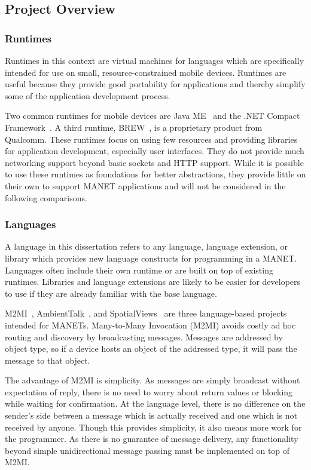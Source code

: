 \subsection{Project Overview}

\subsubsection{Runtimes}

Runtimes in this context are virtual machines for languages which are specifically intended for use on small, resource-constrained mobile devices. Runtimes are useful because they provide good portability for applications and thereby simplify some of the application development process.

Two common runtimes for mobile devices are Java ME~\cite{javame} and the .NET Compact Framework~\cite{dotnetcf}. A third runtime, BREW~\cite{brew}, is a proprietary product from Qualcomm. These runtimes focus on using few resources and providing libraries for application development, especially user interfaces. They do not provide much networking support beyond basic sockets and HTTP support. While it is possible to use these runtimes as foundations for better abstractions, they provide little on their own to support MANET applications and will not be considered in the following comparisons.

\subsubsection{Languages}

A language in this dissertation refers to any language, language extension, or library which provides new language constructs for programming in a MANET. Languages often include their own runtime or are built on top of existing runtimes. Libraries and language extensions are likely to be easier for developers to use if they are already familiar with the base language.

M2MI~\cite{m2mi}, AmbientTalk~\cite{ambienttalk}, and SpatialViews~\cite{nisv} are three language-based projects intended for MANETs. Many-to-Many Invocation (M2MI) avoids costly ad hoc routing and discovery by broadcasting messages. Messages are addressed by object type, so if a device hosts an object of the addressed type, it will pass the message to that object.

The advantage of M2MI is simplicity. As messages are simply broadcast without expectation of reply, there is no need to worry about return values or blocking while waiting for confirmation. At the language level, there is no difference on the sender's side between a message which is actually received and one which is not received by anyone. Though this provides simplicity, it also means more work for the programmer. As there is no guarantee of message delivery, any functionality beyond simple unidirectional message passing must be implemented on top of M2MI.


